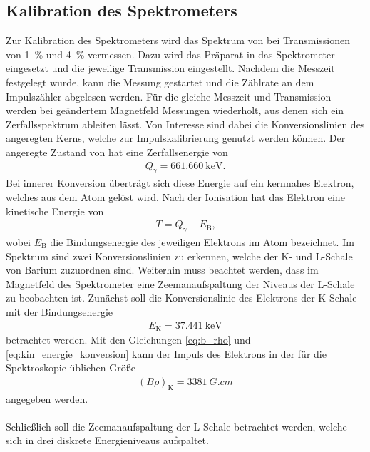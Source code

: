 \documentclass[11pt, a4paper]{article}
\numberwithin{equation}{section}
\begin{document}
\subsection{Kalibration des Spektrometers}
\label{ssec:kalibration}
Zur Kalibration des Spektrometers wird das Spektrum von  bei Transmissionen von \SI{1}{\percent} und \SI{4}{\percent} vermessen.
Dazu wird das Präparat in das Spektrometer eingesetzt und die jeweilige Transmission eingestellt.
Nachdem die Messzeit festgelegt wurde, kann die Messung gestartet und die Zählrate an dem Impulszähler abgelesen werden.
Für die gleiche Messzeit und Transmission werden bei geändertem Magnetfeld Messungen wiederholt, aus denen sich ein Zerfallsspektrum ableiten lässt.
Von Interesse sind dabei die Konversionslinien des angeregten  Kerns, welche zur Impulskalibrierung genutzt werden können.
Der angeregte Zustand von  hat eine Zerfallsenergie von
\begin{align*}
	Q_\gamma = \SI{661,660}{\kilo\electronvolt}\text{.}
\end{align*}
Bei innerer Konversion überträgt sich diese Energie auf ein kernnahes Elektron, welches aus dem Atom gelöst wird.
Nach der Ionisation hat das Elektron eine kinetische Energie von
\begin{align}
	T = Q_\gamma - E_\mathrm{B} \text{,}
	\label{eq:kin_energie_konversion}
\end{align}
wobei $E_\mathrm{B}$ die Bindungsenergie des jeweiligen Elektrons im Atom bezeichnet.
Im Spektrum sind zwei Konversionslinien zu erkennen, welche der K- und L-Schale von Barium zuzuordnen sind.
Weiterhin muss beachtet werden, dass im Magnetfeld des Spektrometer eine Zeemanaufspaltung der Niveaus der L-Schale zu beobachten ist.
Zunächst soll die Konversionslinie des Elektrons der K-Schale mit der Bindungsenergie
\begin{align*}
E_\mathrm{K} = \SI{37,441}{\kilo\electronvolt}
\end{align*}
betrachtet werden.
Mit den Gleichungen \eqref{eq:b_rho} und \eqref{eq:kin_energie_konversion} kann der Impuls des Elektrons in der für die Spektroskopie üblichen Größe
\begin{align*}
	\left(B \rho \right)_\mathrm{K} = \SI{3381}{G.cm}
\end{align*}
angegeben werden.
\\
\\
Schließlich soll die Zeemanaufspaltung der L-Schale betrachtet werden, welche sich in drei diskrete Energieniveaus aufspaltet.
\end{document}
